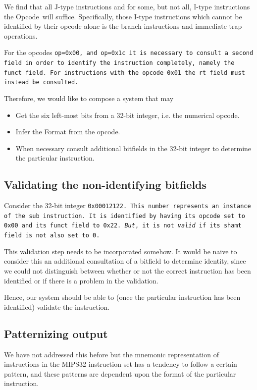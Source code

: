 \documentclass[a4paper]{article}
\newcommand{\opcode}{Opcode\ }
\begin{document}
We find that all J-type instructions and for some, but not all, I-type
instructions the \opcode will suffice. Specifically, those I-type
instructions which cannot be identified by their opcode alone is the
branch instructions and immediate trap operations.

For the opcodes \tt{op=0x00}, and \tt{op=0x1c} it is necessary to
consult a second field in order to identify the instruction
completely, namely the \tt{funct} field. For instructions with the
opcode \tt{0x01} the \tt{rt} field must instead be consulted.

Therefore, we would like to compose a system that may

\begin{itemize}
\item Get the six left-most bits from a 32-bit integer, i.e. the numerical opcode.
\item Infer the Format from the opcode.
\item When necessary consult additional bitfields in the 32-bit integer to
      determine the particular instruction.
\end{itemize}

\subsection{Validating the non-identifying bitfields}\label{section:validation}

Consider the 32-bit integer \tt{0x00012122}. This number represents an
instance of the \tt{sub} instruction. It is identified by
having its opcode set to \tt{0x00} and its funct field to \tt{0x22}.
\emph{But}, it is not \emph{valid} if its shamt field is not also set to 0.

This validation step needs to be incorporated somehow. It would be
naive to consider this an additional consultation of a bitfield to
determine identity, since we could not distinguish between whether or
not the correct instruction has been identified or if there is a
problem in the validation.

Hence, our system should be able to (once the particular instruction
has been identified) validate the instruction.

\subsection{Patternizing output}\label{section:patternizing}

We have not addressed this before but the mnemonic representation of
instructions in the MIPS32 instruction set has a tendency to follow a
certain pattern, and these patterns are dependent upon the format of
the particular instruction.
\end{document}
